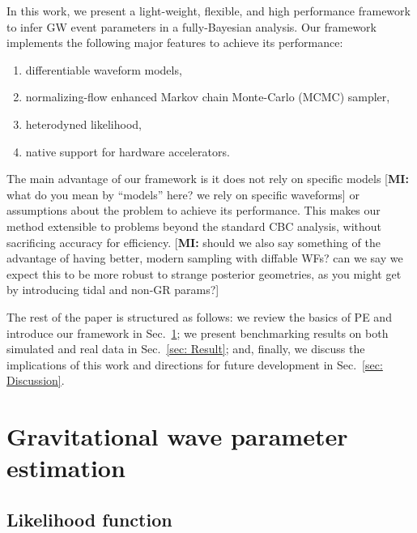 \documentclass[twocolumn]{aastex631}
\newcommand{\mi}[1]{\textsf{\color{teal}[\textbf{MI:} #1]}}
\begin{document}

In this work, we present a light-weight, flexible, and high performance
framework to infer GW event parameters in a fully-Bayesian analysis. Our
framework implements the following major features to achieve its performance:
\begin{enumerate}
\setlength{\itemsep}{0pt}
\item differentiable waveform models,
\item normalizing-flow enhanced Markov chain Monte-Carlo (MCMC) sampler,
\item heterodyned likelihood,
\item native support for hardware accelerators.
\end{enumerate}
The main advantage of our framework is it does not rely on specific models
\mi{what do you mean by ``models'' here? we rely on specific waveforms} or
assumptions about the problem to achieve its performance. This makes our method
extensible to problems beyond the standard CBC analysis, without sacrificing
accuracy for efficiency.
\mi{should we also say something of the advantage of having better, modern
sampling with diffable WFs? can we say we expect this to be more robust to
strange posterior geometries, as you might get by introducing tidal and non-GR
params?}


The rest of the paper is structured as follows: we review the basics of PE and
introduce our framework in Sec.~\ref{sec: PE}; we present benchmarking
results on both simulated and real data in Sec.~\ref{sec: Result}; and, finally,
we discuss the implications of this work and directions for future development
in Sec.~\ref{sec: Discussion}.

\section{Gravitational wave parameter estimation}
\label{sec: PE}

\subsection{Likelihood function}
\label{sec:likelihood}
\end{document}
